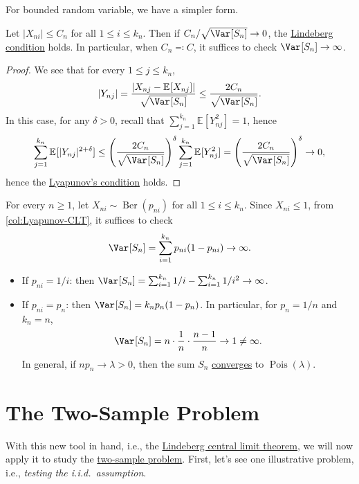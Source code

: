 For bounded random variable, we have a simpler form.

\begin{corollary}\label{col:Lyapunov-CLT}
	Let \(\vert X_{ni} \vert \leq C_n\) for all \(1 \leq i \leq k_n\). Then if \(C_n / \sqrt{\Var_{}[S_n] } \to 0\), the \hyperref[def:Lindeberg-condition]{Lindeberg condition} holds. In particular, when \(C_n \eqqcolon C\), it suffices to check \(\Var_{}[S_n] \to \infty \).
\end{corollary}
\begin{proof}
	We see that for every \(1 \leq j \leq k_n\),
	\[
		\vert Y_{nj} \vert
		= \frac{\vert X_{nj} - \mathbb{E}_{}[X_{nj}] \vert }{\sqrt{\Var_{}[S_n] } }
		\leq \frac{2 C_n}{\sqrt{\Var_{}[S_n] } }.
	\]
	In this case, for any \(\delta > 0\), recall that \(\sum_{j=1}^{k_n} \mathbb{E}_{}[Y_{nj}^2] = 1\), hence
	\[
		\sum_{j=1}^{k_n} \mathbb{E}_{}[\vert Y_{nj} \vert ^{2 + \delta }]
		\leq \left( \frac{2C_n}{\sqrt{\Var_{}[S_n] } } \right) ^\delta \sum_{j=1}^{k_n} \mathbb{E}_{}[Y_{nj}^2]
		= \left( \frac{2C_n}{\sqrt{\Var_{}[S_n] } } \right) ^\delta
		\to 0,
	\]
	hence the \hyperref[thm:Lyapunov-CLT]{Lyapunov's condition} holds.
\end{proof}

\begin{eg}\label{eg:Lyapunov-CLT}
	For every \(n \geq 1\), let \(X_{ni} \sim \operatorname{Ber}(p_{ni}) \) for all \(1 \leq i \leq k_n\). Since \(X_{ni} \leq 1\), from \autoref{col:Lyapunov-CLT}, it suffices to check
	\[
		\Var_{}[S_n]
		= \sum_{i=1}^{k_n} p_{ni} (1 - p_{ni}) \to \infty .
	\]
	\begin{itemize}
		\item If \(p_{ni} = 1 / i\): then \(\Var_{}[S_n] = \sum_{i=1}^{k_n} 1 / i - \sum_{i=1}^{k_n} 1 / i^2 \to \infty \).
		\item If \(p_{ni} = p_n\): then \(\Var_{}[S_n] = k_n p_n (1 - p_n)\). In particular, for \(p_n = 1 / n\) and \(k_n = n\),
		      \[
			      \Var_{}[S_n]
			      = n \cdot \frac{1}{n} \cdot \frac{n-1}{n}
			      \to 1
			      \neq \infty .
		      \]
		      In general, if \(n p_n \to \lambda > 0\), then the sum \(S_n\) \hyperref[def:converge-in-distribution]{converges} to \(\operatorname{Pois}(\lambda ) \).
	\end{itemize}
\end{eg}

\section{The Two-Sample Problem}
With this new tool in hand, i.e., the \hyperref[thm:Lindeberg-CLT]{Lindeberg central limit theorem}, we will now apply it to study the \hyperref[prb:two-sample]{two-sample problem}. First, let's see one illustrative problem, i.e., \emph{testing the i.i.d.\ assumption}.

